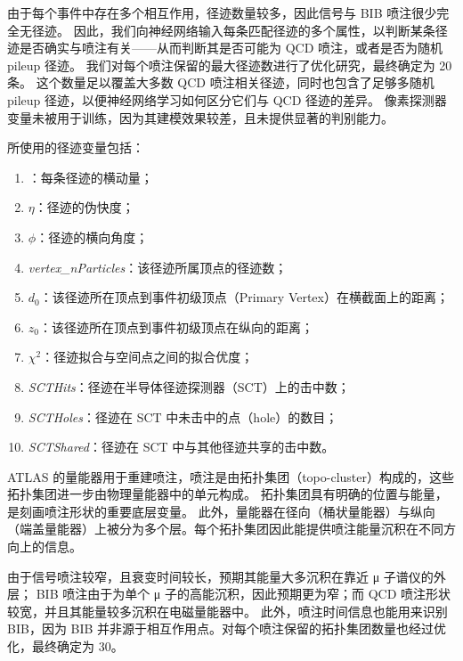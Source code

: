 由于每个事件中存在多个相互作用，径迹数量较多，因此信号与 BIB 喷注很少完全无径迹。
因此，我们向神经网络输入每条匹配径迹的多个属性，以判断某条径迹是否确实与喷注有关——从而判断其是否可能为 QCD 喷注，或者是否为随机 pileup 径迹。
我们对每个喷注保留的最大径迹数进行了优化研究，最终确定为 20 条。
这个数量足以覆盖大多数 QCD 喷注相关径迹，同时也包含了足够多随机 pileup 径迹，以便神经网络学习如何区分它们与 QCD 径迹的差异。
像素探测器变量未被用于训练，因为其建模效果较差，且未提供显著的判别能力。

所使用的径迹变量包括：
\begin{enumerate}
      \item \pt：每条径迹的横动量；
      \item $\eta$：径迹的伪快度；
      \item $\phi$：径迹的横向角度；
      \item \textit{vertex\_nParticles}：该径迹所属顶点的径迹数；
      \item $d_0$：该径迹所在顶点到事件初级顶点（Primary Vertex）在横截面上的距离；
      \item $z_0$：该径迹所在顶点到事件初级顶点在纵向的距离；
      \item $\chi^2$：径迹拟合与空间点之间的拟合优度；
      \item \textit{SCTHits}：径迹在半导体径迹探测器（SCT）上的击中数；
      \item \textit{SCTHoles}：径迹在 SCT 中未击中的点（hole）的数目；
      \item \textit{SCTShared}：径迹在 SCT 中与其他径迹共享的击中数。
\end{enumerate}

ATLAS 的量能器用于重建喷注，喷注是由拓扑集团（topo-cluster）构成的，这些拓扑集团进一步由物理量能器中的单元构成。
拓扑集团具有明确的位置与能量，是刻画喷注形状的重要底层变量。
此外，量能器在径向（桶状量能器）与纵向（端盖量能器）上被分为多个层。每个拓扑集团因此能提供喷注能量沉积在不同方向上的信息。

由于信号喷注较窄，且衰变时间较长，预期其能量大多沉积在靠近 μ 子谱仪的外层；
BIB 喷注由于为单个 μ 子的高能沉积，因此预期更为窄；而 QCD 喷注形状较宽，并且其能量较多沉积在电磁量能器中。
此外，喷注时间信息也能用来识别 BIB，因为 BIB 并非源于相互作用点。对每个喷注保留的拓扑集团数量也经过优化，最终确定为 30。

